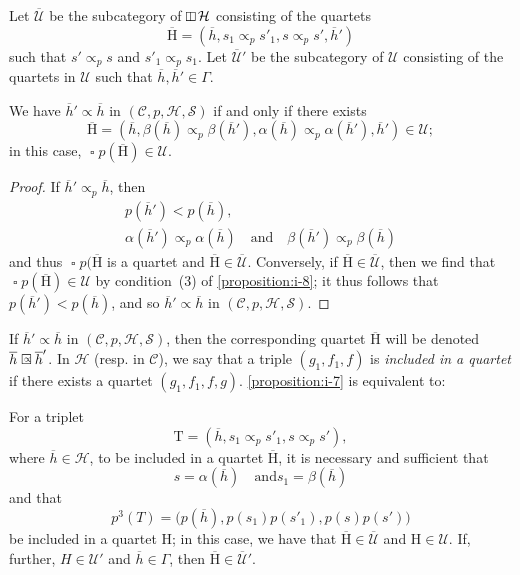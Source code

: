 \documentclass[a4paper,fleqn]{article}
\theoremstyle{plain}
\newenvironment{proposition}[1]
  {\renewcommand\theinnerproposition{#1}\innerproposition}
  {\endinnerproposition}
\theoremstyle{definition}
\newcommand{\oldpage}[1]{{\marginpar{\footnotesize$\bigg\vert$\,\,\,\,\textit{p.~#1}}}}
\newcommand{\textand}{\quad\text{and}\quad}
\newcommand{\CC}{\mathcal{C}}
\newcommand{\HH}{\mathcal{H}}
\newcommand{\rHH}{\mathrm{H}}
\renewcommand{\SS}{\mathcal{S}}
\newcommand{\UU}{\mathcal{U}}
\newcommand{\subs}{\mathrel{\propto}}
\newcommand{\vsqbox}{{\rotatebox{90}{$\boxminus$}}}
\DeclareMathOperator{\sq}{\square}
\DeclareMathOperator{\vsq}{\raisebox{-.1em}{$\vsqbox$}}
\newcommand{\sqsubs}{\mathrel{\mathrlap{\square}\raisebox{.17em}{\scaleobj{0.65}{\,\,\propto}}}}
\begin{document}
\oldpage{366}
Let $\overline{\UU}$ be the subcategory of $\vsq\HH$ consisting of the quartets
\[
  \overline{\rHH}
  = (\overline{h}, s_1\subs_p s'_1, s\subs_p s', \overline{h}')
\]
such that $s'\subs_p s$ and $s'_1\subs_p s_1$.
Let $\overline{\UU}'$ be the subcategory of $\UU$ consisting of the quartets in $\UU$ such that $\overline{h},\overline{h}'\in\Gamma$.

\begin{proposition}{9}
\label{proposition:i-9}
  We have $\overline{h}'\subs\overline{h}$ in $(\CC,p,\HH,\SS)$ if and only if there exists
  \[
    \overline{\rHH}
    = \left(
      \overline{h},
      \beta(\overline{h})\subs_p\beta(\overline{h}'),
      \alpha(\overline{h})\subs_p\alpha(\overline{h}'),
      \overline{h}'
    \right) \in \UU;
  \]
  in this case, $\sq p(\overline{\rHH})\in\UU$.
\end{proposition}

\begin{proof}
  If $\overline{h}'\subs_p\overline{h}$, then
  \[
    \begin{gathered}
      p(\overline{h}')<p(\overline{h}),
    \\\alpha(\overline{h}')\subs_p\alpha(\overline{h})
      \textand
      \beta(\overline{h}')\subs_p\beta(\overline{h})
    \end{gathered}
  \]
  and thus $\sq p(\overline{\rHH}$ is a quartet and $\overline{\rHH}\in\overline{\UU}$.
  Conversely, if $\overline{\rHH}\in\overline{\UU}$, then we find that $\sq p(\overline{\rHH})\in\UU$ by condition~(3) of \cref{proposition:i-8};
  it thus follows that $p(\overline{h}')<p(\overline{h})$, and so $\overline{h}'\subs\overline{h}$ in $(\CC,p,\HH,\SS)$.
\end{proof}

If $\overline{h}'\subs\overline{h}$ in $(\CC,p,\HH,\SS)$, then the corresponding quartet $\overline{\rHH}$ will be denoted $\overline{h}\sqsubs\overline{h}'$.
In $\HH$ (resp. in $\CC$), we say that a triple $(g_1,f_1,f)$  is \emph{included in a quartet} if there exists a quartet $(g_1,f_1,f,g)$.
\cref{proposition:i-7} is equivalent to:

\begin{proposition}{7~\emph{bis}}
\label{proposition:i-7bis}
  For a triplet
  \[
    \mathrm{T}
    = (\overline{h},s_1\subs_p s'_1, s\subs_p s'),
  \]
  where $\overline{h}\in\HH$, to be included in a quartet $\overline{\rHH}$, it is necessary and sufficient that
  \[
    s=\alpha(\overline{h})
    \quad\text{and}
    s_1=\beta(\overline{h})
  \]
  and that
  \[
    p^3(T)
    = \big(
      p(\overline{h}), p(s_1)p(s'_1), p(s)p(s')
    \big)
  \]
  be included in a quartet $\rHH$;
  in this case, we have that $\overline{\rHH}\in\overline{\UU}$ and $\rHH\in\UU$.
  If, further, $H\in\UU'$ and $\overline{h}\in\Gamma$, then $\overline{\rHH}\in\overline{\UU}'$.
\end{proposition}
\end{document}
